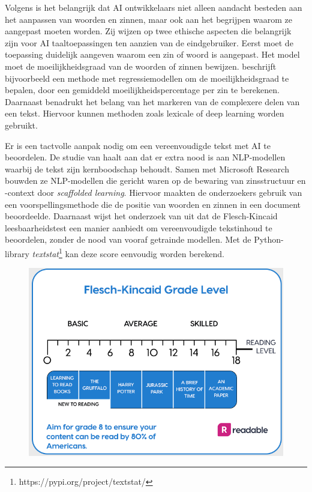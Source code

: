 Volgens \textcite{Garbacea2021} is het belangrijk dat AI ontwikkelaars niet alleen aandacht besteden aan het aanpassen van woorden en zinnen, maar ook aan het begrijpen waarom ze aangepast moeten worden. Zij wijzen op twee ethische aspecten die belangrijk zijn voor AI taaltoepassingen ten aanzien van de eindgebruiker. Eerst moet de toepassing duidelijk aangeven waarom een zin of woord is aangepast. Het model moet de moeilijkheidsgraad van de woorden of zinnen bewijzen. \textcite{Iavarone2021} beschrijft bijvoorbeeld een methode met regressiemodellen om de moeilijkheidsgraad te bepalen, door een gemiddeld moeilijkheidspercentage per zin te berekenen. Daarnaast benadrukt \textcite{Garbacea2021} het belang van het markeren van de complexere delen van een tekst. Hiervoor kunnen methoden zoals lexicale of deep learning worden gebruikt.

Er is een tactvolle aanpak nodig om een vereenvoudigde tekst met AI te beoordelen. De studie van \textcite{Swayamdipta2019} haalt aan dat er extra nood is aan NLP-modellen waarbij de tekst zijn kernboodschap behoudt. Samen met Microsoft Research bouwden ze NLP-modellen die gericht waren op de bewaring van zinsstructuur en -context door \emph{scaffolded learning}. Hiervoor maakten de onderzoekers gebruik van een voorspellingsmethode die de positie van woorden en zinnen in een document beoordeelde. Daarnaast wijst het onderzoek van \textcite{Readable2021} uit dat de Flesch-Kincaid leesbaarheidstest een manier aanbiedt om vereenvoudigde tekstinhoud te beoordelen, zonder de nood van vooraf getrainde modellen. Met de Python-library \textit{textstat}\footnote{https://pypi.org/project/textstat/} kan deze score eenvoudig worden berekend. 

\begin{figure}
	\includegraphics[width=\linewidth]{img/Screenshot_302.png}
	\caption{\autocite{Readable2021}}
\end{figure}

